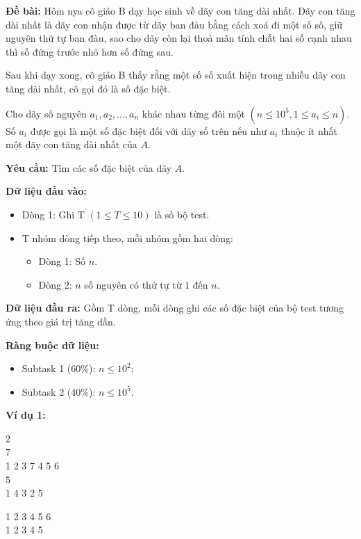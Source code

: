 \documentclass[12pt]{scrartcl}  %
\begin{document}
\textbf{Đề bài:}
Hôm nya cô giáo B dạy học sinh về dãy con tăng dài nhất. Dãy con tăng dài nhất là dãy con nhận được từ dãy ban đàu bằng cách xoá đi một số số, giữ nguyên thứ tự ban đàu, sao cho dãy còn lại thoả mãn tính chất hai số cạnh nhau thì số đứng trước nhỏ hơn số đứng sau.

Sau khi dạy xong, cô giáo B thấy rằng một số số xuất hiện trong nhiều dãy con tăng dài nhất, cô gọi đó là số đặc biệt.

Cho dãy số nguyên $a_1, a_2, ... , a_n$ khác nhau từng đôi một $(n \leq 10^5, 1 \leq a_i \leq n)$. Số $a_i$ được gọi là một số đặc biệt đối với dãy số trên nếu như $a_i$ thuộc ít nhất một dãy con tăng dài nhất của $A$.

\textbf{Yêu cầu:}
Tìm các số đặc biệt của dãy $A$.

\textbf{Dữ liệu đầu vào:}
\begin{itemize}
    \item Dòng 1: Ghi T $(1 \leq T \leq 10)$ là số bộ test.
    \item T nhóm dòng tiếp theo, mỗi nhóm gồm hai dòng:
    \begin{itemize}
        \item Dòng 1: Số $n$.
        \item Dòng 2: $n$ số nguyên có thứ tự từ $1$ đến $n$.
    \end{itemize}
\end{itemize}

\textbf{Dữ liệu đầu ra:}
Gồm T dòng, mỗi dòng ghi các số đặc biệt của bộ test tương ứng theo giá trị tăng dần.

\textbf{Ràng buộc dữ liệu:}
\begin{itemize}
    \item Subtask 1 (60\%): $n \leq 10^2$;
    \item Subtask 2 (40\%): $n \leq 10^5$.
\end{itemize}

\textbf{Ví dụ 1:}
\begin{tcolorbox}[colback=gray!5!white, colframe=blue!50!black, title=Input]
2\\
7\\
1 2 3 7 4 5 6\\
5\\
1 4 3 2 5
\end{tcolorbox}
\begin{tcolorbox}[colback=gray!5!white, colframe=green!50!black, title=Output]
1 2 3 4 5 6\\
1 2 3 4 5
\end{tcolorbox}
\end{document}
